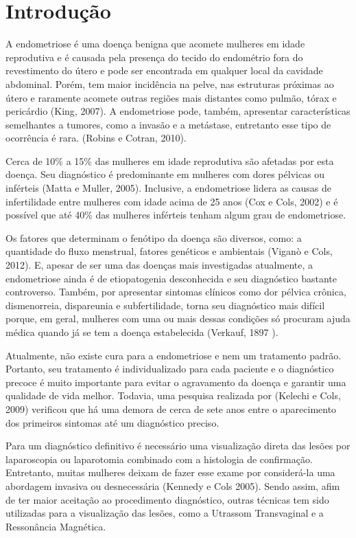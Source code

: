 \documentclass[12pt]{article} %
\begin{document}
\newpage


\section{Introdução}

A endometriose é uma doença benigna que acomete mulheres em idade
reprodutiva e é causada pela presença do tecido do endométrio fora do
revestimento do útero e pode ser encontrada em qualquer local da
cavidade abdominal. Porém, tem maior incidência na pelve, nas
estruturas próximas ao útero e raramente acomete outras regiões mais
distantes como pulmão, tórax e pericárdio (King, 2007). A endometriose
pode, também, apresentar características semelhantes a tumores, como a
invasão e a metástase, entretanto esse tipo de ocorrência é
rara. (Robins e Cotran, 2010).

Cerca de 10\% a 15\% das mulheres em idade reprodutiva são afetadas
por esta doença. Seu diagnóstico é predominante em mulheres com dores
pélvicas ou inférteis (Matta e Muller, 2005).  Inclusive, a
endometriose lidera as causas de infertilidade entre mulheres com
idade acima de 25 anos (Cox e Cols, 2002) e é possível que até 40\%
das mulheres inférteis tenham algum grau de endometriose.

Os fatores que determinam o fenótipo da doença são diversos, como: a
quantidade do fluxo menstrual, fatores genéticos e ambientais (Viganò
e Cols, 2012). E, apesar de ser uma das doenças mais investigadas
atualmente, a endometriose ainda é de etiopatogenia desconhecida e seu
diagnóstico bastante controverso. Também, por apresentar sintomas
clínicos como dor pélvica crônica, dismenorreia, dispareunia e
subfertilidade, torna seu diagnóstico mais difícil porque, em geral,
mulheres com uma ou mais dessas condições só procuram ajuda médica
quando já se tem a doença estabelecida (Verkauf, 1897 ). 

Atualmente, não existe cura para a endometriose e nem um tratamento
padrão. Portanto, seu tratamento é individualizado para cada paciente
e o diagnóstico precoce é muito importante para evitar o agravamento
da doença e garantir uma qualidade de vida melhor.  Todavia, uma
pesquisa realizada por (Kelechi e Cols, 2009) verificou que há uma
demora de cerca de sete anos entre o aparecimento dos primeiros
sintomas até um diagnóstico preciso.

Para um diagnóstico definitivo é necessário uma visualização direta
das lesões por laparoscopia ou laparotomia combinado com a histologia
de confirmação. Entretanto, muitas mulheres deixam de fazer esse exame
por considerá-la uma abordagem invasiva ou desnecessária (Kennedy e
Cols 2005).  Sendo assim, afim de ter maior aceitação ao procedimento
diagnóstico, outras técnicas tem sido utilizadas para a visualização
das lesões, como a Utrassom Transvaginal e a Ressonância Magnética.
\end{document}
